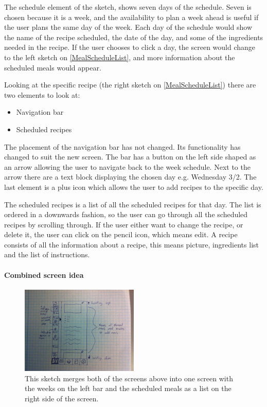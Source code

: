 The schedule element of the sketch, shows seven days of the schedule. Seven is chosen because it is a week, and the availability to plan a week ahead is useful if the user plans the same day of the week. Each day of the schedule would show the name of the recipe scheduled, the date of the day, and some of the ingredients needed in the recipe. If the user chooses to click a day, the screen would change to the left sketch on \cref{MealScheduleList}, and more information about the scheduled meals would appear.

Looking at the specific recipe (the right sketch on \cref{MealScheduleList}) there are two elements to look at:   

\begin{itemize}
    \item Navigation bar
    \item Scheduled recipes
\end{itemize}

The placement of the navigation bar has not changed. Its functionality has changed to suit the new screen. The bar has a button on the left side shaped as an arrow allowing the user to navigate back to the week schedule. Next to the arrow there are a text block displaying the chosen day e.g. Wednesday 3/2. The last element is a plus icon which allows the user to add recipes to the specific day.  



The scheduled recipes is a list of all the scheduled recipes for that day. The list is ordered in a downwards fashion, so the user can go through all the scheduled recipes by scrolling through. If the user either want to change the recipe, or delete it, the user can click on the pencil icon, which means edit. A recipe consists of all the information about a recipe, this means picture, ingredients list and the list of instructions.

\paragraph{Combined screen idea}

\begin{figure}[H]
	\centering
    \includegraphics[width=0.5\textwidth]{Grafik/FoodPlanner/FinalMealScheduleSketch2}
	\caption{This sketch merges both of the screens above into one screen with the weeks on the left bar and the scheduled meals as a list on the right side of the screen.}
	\label{MealScheduleBar}
\end{figure}

